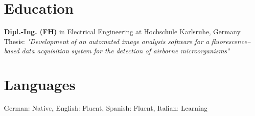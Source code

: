 \documentclass[9pt, a4paper]{extarticle}
\newcommand{\years}[1]{\marginnote{\scriptsize #1}}
\begin{document}
\section*{Education}
\years{2009} {\bf Dipl.-Ing. (FH)} in Electrical Engineering at Hochschule Karlsruhe, Germany\\
Thesis: \emph{"Development of an automated image analysis software for a fluorescence--based data acquisition system for the detection of airborne microorganisms"}

\section*{Languages}
German: Native, English: Fluent, Spanish: Fluent, Italian: Learning
\end{document}
